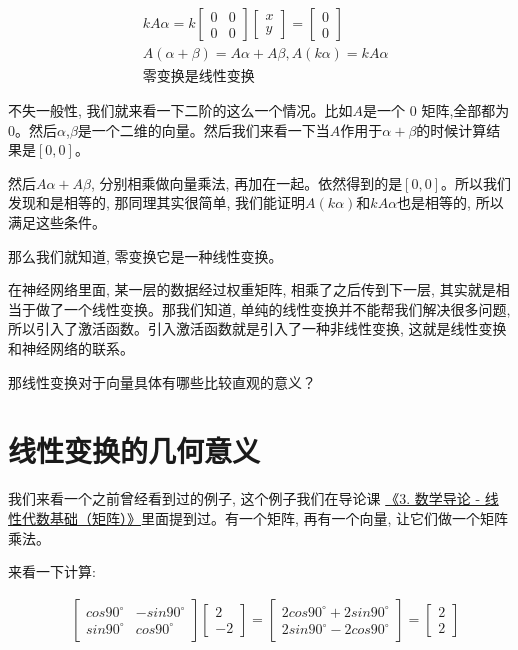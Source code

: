 \begin{align*}
  & kA\alpha = k\begin{bmatrix} 0 & 0 \\ 0 & 0\end{bmatrix}\begin{bmatrix}x \\ y \end{bmatrix} = \begin{bmatrix} 0 \\ 0 \end{bmatrix}\\
  & A(\alpha+\beta) = A\alpha + A\beta, A(k\alpha) = kA\alpha \\
  &  \mbox{零变换是线性变换}
\end{align*}

不失一般性, 我们就来看一下二阶的这么一个情况。比如$A$是一个 0 矩阵,全部都为 0。然后$\alpha$,$\beta$是一个二维的向量。然后我们来看一下当$A$作用于$\alpha+\beta$的时候计算结果是$[0,0]$。

然后$A\alpha+A\beta$, 分别相乘做向量乘法, 再加在一起。依然得到的是$[0, 0]$。所以我们发现和是相等的, 那同理其实很简单, 我们能证明$A(k\alpha)$和$kA\alpha$也是相等的, 所以满足这些条件。

那么我们就知道, 零变换它是一种线性变换。

在神经网络里面, 某一层的数据经过权重矩阵, 相乘了之后传到下一层, 其实就是相当于做了一个线性变换。那我们知道, 单纯的线性变换并不能帮我们解决很多问题, 所以引入了激活函数。引入激活函数就是引入了一种非线性变换, 这就是线性变换和神经网络的联系。

那线性变换对于向量具体有哪些比较直观的意义？

\section{线性变换的几何意义}

我们来看一个之前曾经看到过的例子, 这个例子我们在导论课 \hyperlink{3.线性代数基础}{《3. 数学导论 - 线性代数基础（矩阵）》}里面提到过。有一个矩阵, 再有一个向量, 让它们做一个矩阵乘法。

来看一下计算: 

\begin{align*}
  & \begin{bmatrix}
  cos90^{\circ} & -sin90^{\circ} \\
  sin90^{\circ} & cos90^{\circ}
  \end{bmatrix}
  \begin{bmatrix}
  2 \\ -2
  \end{bmatrix} 
  = \begin{bmatrix}
  2cos90^{\circ} + 2sin90^{\circ} \\
  2sin90^{\circ} - 2cos90^{\circ}
  \end{bmatrix} 
  = \begin{bmatrix} 2 \\ 2 \end{bmatrix}
\end{align*}

